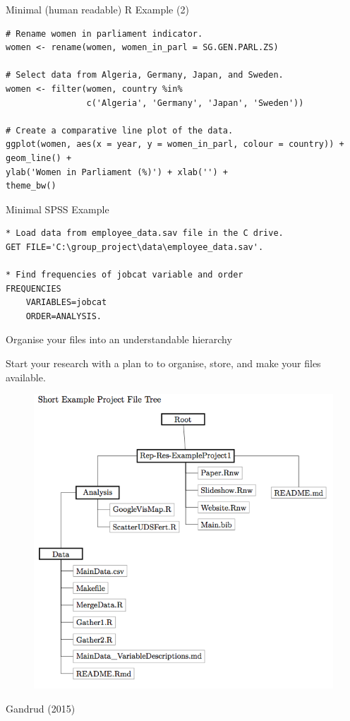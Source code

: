 \documentclass[10pt]{beamer}
\begin{document}
\begin{frame}[fragile]{Minimal (human readable) R Example (2)}

\begin{lstlisting}
# Rename women in parliament indicator.
women <- rename(women, women_in_parl = SG.GEN.PARL.ZS)

# Select data from Algeria, Germany, Japan, and Sweden.
women <- filter(women, country %in%
                c('Algeria', 'Germany', 'Japan', 'Sweden'))

# Create a comparative line plot of the data.
ggplot(women, aes(x = year, y = women_in_parl, colour = country)) +
geom_line() +
ylab('Women in Parliament (%)') + xlab('') +
theme_bw()
\end{lstlisting}

\end{frame}


\begin{frame}[fragile]{Minimal SPSS Example}

\begin{lstlisting}
* Load data from employee_data.sav file in the C drive.
GET FILE='C:\group_project\data\employee_data.sav'.

* Find frequencies of jobcat variable and order
FREQUENCIES
    VARIABLES=jobcat
    ORDER=ANALYSIS.
\end{lstlisting}

\end{frame}

\begin{frame}{Organise your files into an understandable hierarchy}

    Start your research with a plan to to organise, store, and make your files available.

    \begin{figure}
        \includegraphics[scale=0.3]{img/file_tree.png}
    \end{figure}

{\tiny{Gandrud (2015)}}

\end{frame}
\end{document}

